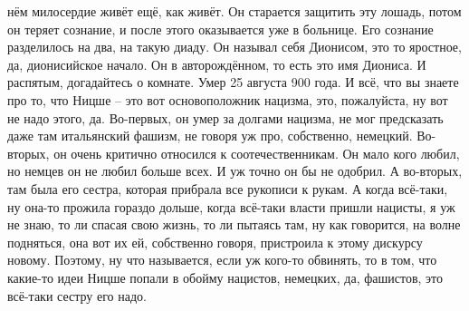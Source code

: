 нём милосердие живёт ещё, как живёт. Он старается защитить эту лошадь, потом он
теряет сознание, и после этого оказывается уже в больнице. Его сознание
разделилось на два, на такую диаду. Он называл себя Дионисом, это то яростное,
да, дионисийское начало. Он в авторождённом, то есть это имя Диониса. И
распятым, догадайтесь о комнате. Умер 25 августа 900 года. И всё, что вы знаете
про то, что Ницше – это вот основоположник нацизма, это, пожалуйста, ну вот не
надо этого, да. Во-первых, он умер за долгами нацизма, не мог предсказать даже
там итальянский фашизм, не говоря уж про, собственно, немецкий. Во-вторых, он
очень критично относился к соотечественникам. Он мало кого любил, но немцев он
не любил больше всех. И уж точно он бы не одобрил. А во-вторых, там была его
сестра, которая прибрала все рукописи к рукам. А когда всё-таки, ну она-то
прожила гораздо дольше, когда всё-таки власти пришли нацисты, я уж не знаю, то
ли спасая свою жизнь, то ли пытаясь там, ну как говорится, на волне подняться,
она вот их ей, собственно говоря, пристроила к этому дискурсу новому. Поэтому,
ну что называется, если уж кого-то обвинять, то в том, что какие-то идеи Ницше
попали в обойму нацистов, немецких, да, фашистов, это всё-таки сестру его надо.

